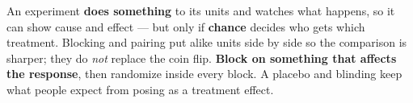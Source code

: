 \documentclass[12pt]{article}
\begin{document}
\vspace{0.14in}

\boxguard[8]
\begin{remindbox}
\small
An experiment \textbf{does something} to its units and watches what happens, so it can show
cause and effect --- but only if \textbf{chance} decides who gets which treatment. Blocking
and pairing put alike units side by side so the comparison is sharper; they do \emph{not}
replace the coin flip. \textbf{Block on something that affects the response}, then randomize
inside every block. A placebo and blinding keep what people expect from posing as a treatment
effect.
\end{remindbox}
\end{document}
